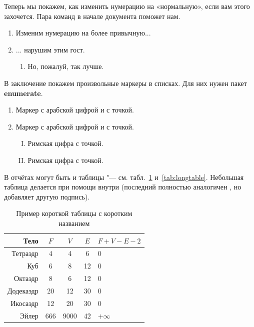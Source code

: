 Теперь мы покажем, как изменить нумерацию на «нормальную», если вам этого захочется. Пара команд в начале документа поможет нам.

\renewcommand{\labelenumi}{\arabic{enumi})}
\renewcommand{\labelenumii}{\asbuk{enumii})}

\begin{enumerate}
\item Изменим нумерацию на более привычную...
\item ... нарушим этим гост.
\begin{enumerate}
\item Но, пожалуй, так лучше.
\end{enumerate}
\end{enumerate}

В заключение покажем произвольные маркеры в списках. Для них нужен пакет \textbf{enumerate}.
\begin{enumerate}[1.]
\item Маркер с арабской цифрой и с точкой.
\item Маркер с арабской цифрой и с точкой.
\begin{enumerate}[I.]
\item Римская цифра с точкой.
\item Римская цифра с точкой.
\end{enumerate}
\end{enumerate}

В отчётах могут быть и таблицы "--- см. табл.~\ref{tab:tabular} и~\ref{tab:longtable}.
Небольшая таблица делается при помощи  внутри  (последний
полностью аналогичен , но добавляет другую подпись).

\begin{table}[ht]
  \caption{Пример короткой таблицы с коротким названием}
  \begin{tabular}{|r|c|c|c|l|}
  \hline
  Тело      & $F$ & $V$  & $E$ & $F+V-E-2$ \\
  \hline
  Тетраэдр  & 4   & 4    & 6   & 0         \\
  Куб       & 6   & 8    & 12  & 0         \\
  Октаэдр   & 8   & 6    & 12  & 0         \\
  Додекаэдр & 20  & 12   & 30  & 0         \\
  Икосаэдр  & 12  & 20   & 30  & 0         \\
  \hline
  Эйлер     & 666 & 9000 & 42  & $+\infty$ \\
  \hline
  \end{tabular}
  \label{tab:tabular}
\end{table}

